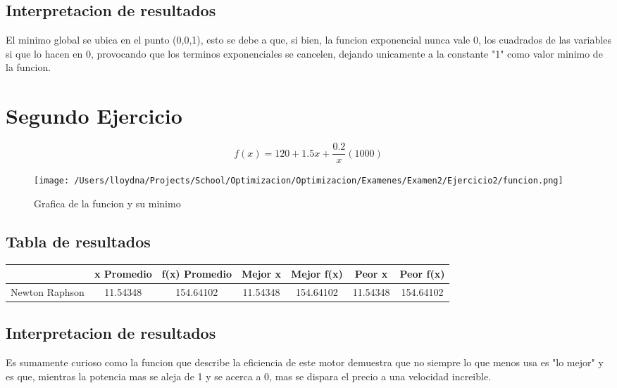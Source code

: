 \documentclass{report}
\begin{document}
            \subsection{Interpretacion de resultados}
                El minimo global se ubica en el punto (0,0,1), esto se debe a que, si bien, la funcion exponencial
                nunca vale 0, los cuadrados de las variables si que lo hacen en 0, provocando que los terminos exponenciales
                se cancelen, dejando unicamente a la constante "1" como valor minimo de la funcion.
        \pagebreak

        \section{Segundo Ejercicio}
            \begin{equation*}
                f(x)=120+1.5x+\frac{0.2}{x}(1000) 
            \end{equation*}

            \begin{figure}[H]
                \texttt{[image: /Users/lloydna/Projects/School/Optimizacion/Optimizacion/Examenes/Examen2/Ejercicio2/funcion.png]}
                \caption{Grafica de la funcion y su minimo}
                \label{fig:fun12}
            \end{figure}

            \subsection{Tabla de resultados}
                \begin{tabular}{l|c|c|c|c|c|c}
                    & x Promedio & f(x) Promedio & Mejor x & Mejor f(x) & Peor x & Peor f(x)\\
                    \hline
                    Newton Raphson & 11.54348 & 154.64102 & 11.54348 & 154.64102 & 11.54348 & 154.64102\\
                    \hline
                \end{tabular}

            \subsection{Interpretacion de resultados}
                Es sumamente curioso como la funcion que describe la eficiencia de este motor demuestra que no siempre lo que menos usa es "lo mejor"
                y es que, mientras la potencia mas se aleja de 1 y se acerca a 0, mas se dispara el precio a una velocidad increible.
        \pagebreak
\end{document}
